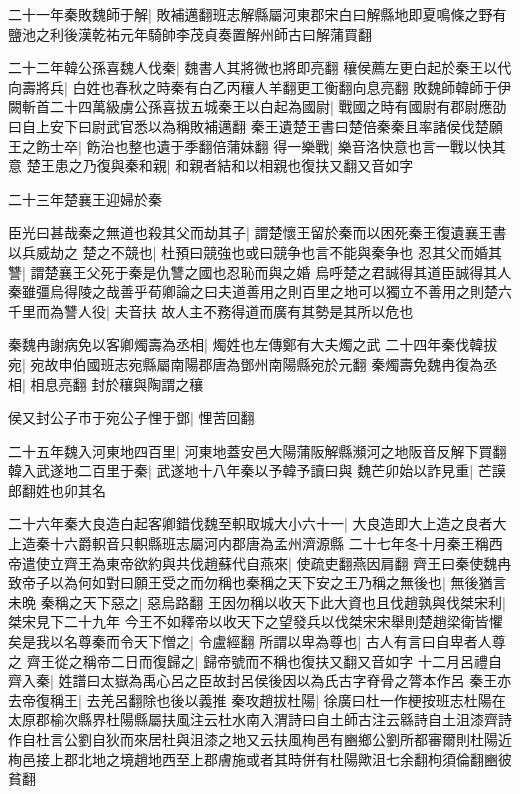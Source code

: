 二十一年秦敗魏師于解|{
	敗補邁翻班志解縣屬河東郡宋白曰解縣地即夏鳴條之野有鹽池之利後漢乾祐元年騎帥李茂貞奏置解州師古曰解蒲買翻}


二十二年韓公孫喜魏人伐秦|{
	魏書人其將微也將即亮翻}
穰侯薦左更白起於秦王以代向壽將兵|{
	白姓也春秋之時秦有白乙丙穰人羊翻更工衡翻向息亮翻}
敗魏師韓師于伊闕斬首二十四萬級虜公孫喜拔五城秦王以白起為國尉|{
	戰國之時有國尉有郡尉應劭曰自上安下曰尉武官悉以為稱敗補邁翻}
秦王遺楚王書曰楚倍秦秦且率諸侯伐楚願王之飭士卒|{
	飭治也整也遺于季翻倍蒲妹翻}
得一樂戰|{
	樂音洛快意也言一戰以快其意}
楚王患之乃復與秦和親|{
	和親者結和以相親也復扶又翻又音如字}


二十三年楚襄王迎婦於秦

臣光曰甚哉秦之無道也殺其父而劫其子|{
	謂楚懷王留於秦而以困死秦王復遺襄王書以兵威劫之}
楚之不競也|{
	杜預曰競強也或曰競争也言不能與秦争也}
忍其父而婚其讐|{
	謂楚襄王父死于秦是仇讐之國也忍恥而與之婚}
烏呼楚之君誠得其道臣誠得其人秦雖彊烏得陵之哉善乎荀卿論之曰夫道善用之則百里之地可以獨立不善用之則楚六千里而為讐人役|{
	夫音扶}
故人主不務得道而廣有其勢是其所以危也

秦魏冉謝病免以客卿燭壽為丞相|{
	燭姓也左傳鄭有大夫燭之武}
二十四年秦伐韓拔宛|{
	宛故申伯國班志宛縣屬南陽郡唐為鄧州南陽縣宛於元翻}
秦燭壽免魏冉復為丞相|{
	相息亮翻}
封於穰與陶謂之穰

侯又封公子市于宛公子悝于鄧|{
	悝苦回翻}


二十五年魏入河東地四百里|{
	河東地蓋安邑大陽蒲阪解縣瀕河之地阪音反解下買翻}
韓入武遂地二百里于秦|{
	武遂地十八年秦以予韓予讀曰與}
魏芒卯始以詐見重|{
	芒謨郎翻姓也卯其名}


二十六年秦大良造白起客卿錯伐魏至軹取城大小六十一|{
	大良造即大上造之良者大上造秦十六爵軹音只軹縣班志屬河内郡唐為孟州濟源縣}
二十七年冬十月秦王稱西帝遣使立齊王為東帝欲約與共伐趙蘇代自燕來|{
	使疏吏翻燕因肩翻}
齊王曰秦使魏冉致帝子以為何如對曰願王受之而勿稱也秦稱之天下安之王乃稱之無後也|{
	無後猶言未晩}
秦稱之天下惡之|{
	惡烏路翻}
王因勿稱以收天下此大資也且伐趙孰與伐桀宋利|{
	桀宋見下二十九年}
今王不如釋帝以收天下之望發兵以伐桀宋宋舉則楚趙梁衛皆懼矣是我以名尊秦而令天下憎之|{
	令盧經翻}
所謂以卑為尊也|{
	古人有言曰自卑者人尊之}
齊王從之稱帝二日而復歸之|{
	歸帝號而不稱也復扶又翻又音如字}
十二月呂禮自齊入秦|{
	姓譜曰太嶽為禹心呂之臣故封呂侯後因以為氏古字脊骨之膂本作呂}
秦王亦去帝復稱王|{
	去羌呂翻除也後以義推}
秦攻趙拔杜陽|{
	徐廣曰杜一作梗按班志杜陽在太原郡榆次縣界杜陽縣屬扶風注云杜水南入渭詩曰自土師古注云緜詩自土沮漆齊詩作自杜言公劉自狄而來居杜與沮漆之地又云扶風栒邑有豳鄉公劉所都審爾則杜陽近栒邑接上郡北地之境趙地西至上郡膚施或者其時併有杜陽歟沮七余翻枸須倫翻豳彼貧翻}


